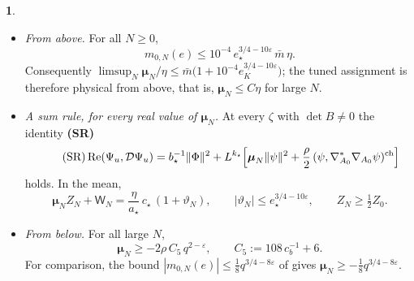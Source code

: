 \documentclass[11pt]{amsart}
\newcommand{\namedhead}{}
\theoremstyle{definition}
\newtheorem*{namedinner}{\namedhead}
\newenvironment{named}[1]{\renewcommand{\namedhead}{#1}\begin{namedinner}}{\end{namedinner}}
\begin{document}
\begin{named}{Theorem 5.16}
\begin{itemize}
\begin{equation*}
\frac{\mathscr F_{k_\star}(\Omega;\Psi)}{\mathscr F_{k_\star}(\Omega;0)}=\mathsf E_N\exp\bigl(-\langle\bar\Psi,\mathcal D\Psi\rangle\bigr),\qquad\mathscr F_{k_\star}:=\mathscr F_{k_\star}\bigl[\varepsilon^{\mathrm v,t}_{k_\star},0,E_{k_\star}\bigr].
\end{equation*}
If $\boldsymbol\mu_N>0$, then $\operatorname{Re}\mathcal D(\zeta)\ge\bigl(b_\star^{-1}+(L^{k_\star}\boldsymbol\mu_N)^{-1}\bigr)^{-1}$ for every $\zeta$.
\item[(b)] \emph{From above.}
For all $N\ge0$,
\begin{equation*}
m_{0,N}(e)\le10^{-4}\,e_\star^{3/4-10\varepsilon}\,\bar m\,\eta .
\end{equation*}
Consequently $\limsup_N\boldsymbol\mu_N/\eta\le\bar m\bigl(1+10^{-4}e_K^{3/4-10\varepsilon}\bigr)$;
the tuned assignment is therefore physical from above, that is, $\boldsymbol\mu_N\le C\eta$ for large $N$.
\item[(c)] \emph{A sum rule, for every real value of $\boldsymbol\mu_N$.}
At every $\zeta$ with $\det B\ne0$ the identity \textbf{(SR)}
\begin{equation}
\tag{SR}
\operatorname{Re}(\Psi_u,\mathcal D\Psi_u)=b_\star^{-1}\|\Phi\|^2+L^{k_\star}\Bigl[\boldsymbol\mu_N\|\psi\|^2+\frac\rho2\,(\psi,\nabla^*_{A_0}\nabla_{A_0}\psi)^{\mathrm{ch}}\Bigr]
\end{equation}
holds.
In the mean,
\begin{equation*}
\boldsymbol\mu_NZ_N+\mathsf W_N=\frac\eta{a_\star}\,c_\star\,(1+\vartheta_N),\qquad|\vartheta_N|\le e_\star^{3/4-10\varepsilon},\qquad Z_N\ge\tfrac12Z_0 .
\end{equation*}
\item[(d)] \emph{From below.}
For all large $N$,
\begin{equation*}
\boldsymbol\mu_N\ge-2\rho\,C_5\,q^{2-\varepsilon},\qquad C_5:=108\,c_b^{-1}+6 .
\end{equation*}
For comparison, the bound $|m_{0,N}(e)|\le\frac18q^{3/4-8\varepsilon}$ of \cite[Proposition~28.3\,(d)]{QEDIII} gives $\boldsymbol\mu_N\ge-\frac18q^{3/4-8\varepsilon}$.
\end{itemize}
\end{named}
\end{document}
